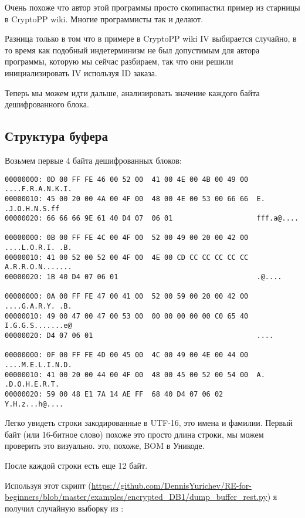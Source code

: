 Очень похоже что автор этой программы просто скопипастил пример из старницы в CryptoPP wiki.
Многие программисты так и делают.

Разница только в том что в примере в CryptoPP wiki \ac{IV} выбирается случайно, в то время как подобный индетерминизм
не был допустимым для автора программы, которую мы сейчас разбираем,
так что они решили инициализировать \ac{IV} используя ID заказа.

Теперь мы можем идти дальше, анализировать значение каждого байта дешифрованного блока.

\subsection{Структура буфера}

Возьмем первые 4 байта дешифрованных блоков:

\begin{lstlisting}
00000000: 0D 00 FF FE 46 00 52 00  41 00 4E 00 4B 00 49 00  ....F.R.A.N.K.I.
00000010: 45 00 20 00 4A 00 4F 00  48 00 4E 00 53 00 66 66  E. .J.O.H.N.S.ff
00000020: 66 66 66 9E 61 40 D4 07  06 01                    fff.a@....

00000000: 0B 00 FF FE 4C 00 4F 00  52 00 49 00 20 00 42 00  ....L.O.R.I. .B.
00000010: 41 00 52 00 52 00 4F 00  4E 00 CD CC CC CC CC CC  A.R.R.O.N.......
00000020: 1B 40 D4 07 06 01                                 .@....

00000000: 0A 00 FF FE 47 00 41 00  52 00 59 00 20 00 42 00  ....G.A.R.Y. .B.
00000010: 49 00 47 00 47 00 53 00  00 00 00 00 00 C0 65 40  I.G.G.S.......e@
00000020: D4 07 06 01                                       ....

00000000: 0F 00 FF FE 4D 00 45 00  4C 00 49 00 4E 00 44 00  ....M.E.L.I.N.D.
00000010: 41 00 20 00 44 00 4F 00  48 00 45 00 52 00 54 00  A. .D.O.H.E.R.T.
00000020: 59 00 48 E1 7A 14 AE FF  68 40 D4 07 06 02        Y.H.z...h@....
\end{lstlisting}

Легко увидеть строки закодированные в UTF-16, это имена и фамилии.
Первый байт (или 16-битное слово) похоже это просто длина строки, мы можем проверить это визуально.
 это, похоже, \ac{BOM} в Уникоде.

После каждой строки есть еще 12 байт.

Используя этот скрипт
(\url{https://github.com/DennisYurichev/RE-for-beginners/blob/master/examples/encrypted_DB1/dump_buffer_rest.py})
я получил случайную выборку из :

